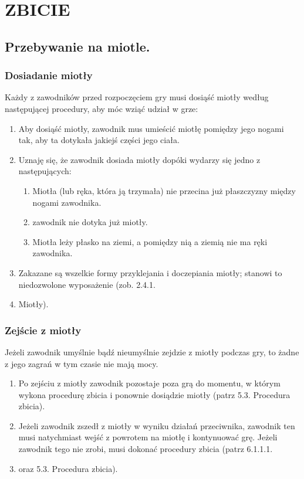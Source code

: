 \documentclass[12pt]{article}
\begin{document}
\pagebreak
\section{ZBICIE}

\subsection{Przebywanie na miotle.}

\subsubsection{Dosiadanie miotły}

Każdy z zawodników przed rozpoczęciem gry musi dosiąść miotły według
następującej procedury, aby móc wziąć udział w grze:

\begin{enumerate}
\item
  Aby dosiąść miotły, zawodnik mus umieścić miotłę pomiędzy jego nogami
  tak, aby ta dotykała jakiejś części jego ciała.
\item
  Uznaję się, że zawodnik dosiada miotły dopóki wydarzy się jedno z
  następujących:

  \begin{enumerate}
  \item
        Miotła (lub ręka, która ją trzymała) nie przecina już płaszczyzny
    między nogami zawodnika.
      \item
        zawodnik nie dotyka już miotły.
      \item
        Miotła leży płasko na ziemi, a pomiędzy nią a ziemią nie ma ręki
    zawodnika.
      \end{enumerate}
\item
  Zakazane są wszelkie formy przyklejania i doczepiania miotły; stanowi
  to niedozwolone wyposażenie (zob. 2.4.1.\item Miotły).
\end{enumerate}

\subsubsection{Zejście z miotły}

Jeżeli zawodnik umyślnie bądź nieumyślnie zejdzie z miotły podczas gry,
to żadne z jego zagrań w tym czasie nie mają mocy.

\begin{enumerate}
\item
  Po zejściu z miotły zawodnik pozostaje poza grą do momentu, w którym
  wykona procedurę zbicia i ponownie dosiądzie miotły (patrz 5.3.
  Procedura zbicia).
\item
  Jeżeli zawodnik zszedł z miotły w wyniku działań przeciwnika, zawodnik
  ten musi natychmiast wejść z powrotem na miotłę i kontynuować grę.
  Jeżeli zawodnik tego nie zrobi, musi dokonać procedury zbicia (patrz
  6.1.1.1.\item oraz 5.3. Procedura zbicia).
\end{enumerate}
\end{document}
